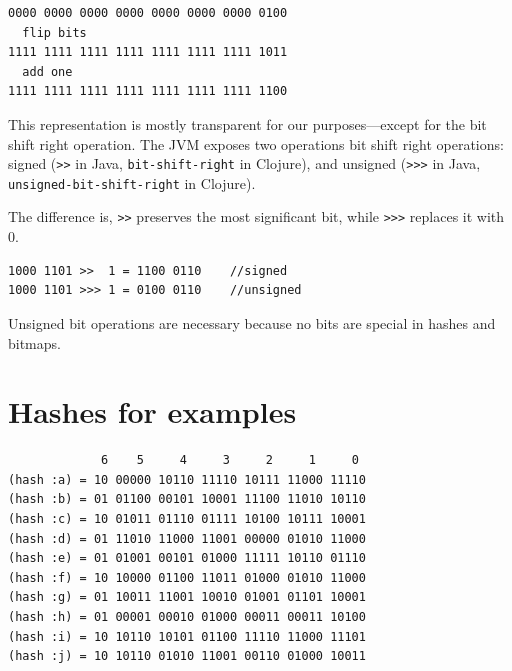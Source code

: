 \documentclass[preprint]{sigplanconf}
\begin{document}
\begin{verbatim}
0000 0000 0000 0000 0000 0000 0000 0100
  flip bits
1111 1111 1111 1111 1111 1111 1111 1011
  add one
1111 1111 1111 1111 1111 1111 1111 1100
\end{verbatim}

This representation is mostly transparent for our
purposes---except for the bit shift right operation.
%
The JVM exposes two operations bit shift right
operations: signed
(\texttt{>>} in Java, \texttt{bit-shift-right} in Clojure),
and unsigned
(\texttt{>>>} in Java, \texttt{unsigned-bit-shift-right} in Clojure).

The difference is, \texttt{>>} preserves the most significant
bit, while \texttt{>>>} replaces it with 0.
%
\begin{verbatim}
1000 1101 >>  1 = 1100 0110    //signed
1000 1101 >>> 1 = 0100 0110    //unsigned
\end{verbatim}
%
Unsigned bit operations are necessary because no bits
are special in hashes and bitmaps.

\section{Hashes for examples}
\label{hash-examples}

\begin{verbatim}
             6    5     4     3     2     1     0
(hash :a) = 10 00000 10110 11110 10111 11000 11110
(hash :b) = 01 01100 00101 10001 11100 11010 10110
(hash :c) = 10 01011 01110 01111 10100 10111 10001
(hash :d) = 01 11010 11000 11001 00000 01010 11000
(hash :e) = 01 01001 00101 01000 11111 10110 01110
(hash :f) = 10 10000 01100 11011 01000 01010 11000
(hash :g) = 01 10011 11001 10010 01001 01101 10001
(hash :h) = 01 00001 00010 01000 00011 00011 10100
(hash :i) = 10 10110 10101 01100 11110 11000 11101
(hash :j) = 10 10110 01010 11001 00110 01000 10011
\end{verbatim}
\end{document}
